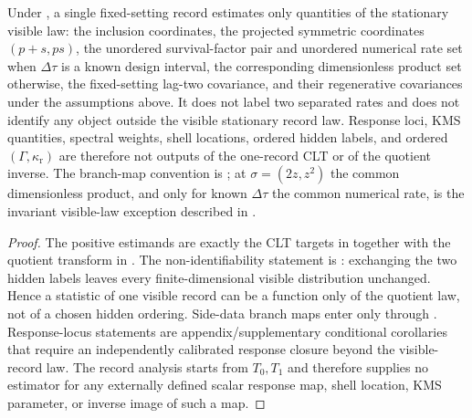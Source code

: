 \begin{proposition}\label{thm:one-record-estimates-main}
Under , a single fixed-setting
record estimates only quantities of the stationary visible law: the inclusion
coordinates, the projected
symmetric coordinates \((p+s,ps)\), the unordered survival-factor pair and
unordered numerical rate set when \(\Delta\tau\) is a known design interval,
the corresponding dimensionless product set otherwise, the fixed-setting
lag-two covariance, and their regenerative covariances under the assumptions
above.  It does not label two separated rates and does not identify any object
outside the visible stationary record law.  Response loci, KMS quantities,
spectral weights, shell locations, ordered hidden labels, and ordered
\((\Gamma,\kappa_{\mathrm r})\) are therefore not outputs of the one-record
CLT or of the quotient inverse.  The branch-map convention is
; at \(\sigma=(2z,z^2)\) the common
dimensionless product, and only for known \(\Delta\tau\) the common numerical
rate, is the invariant visible-law exception described in
.
\end{proposition}

\begin{proof}
The positive estimands are exactly the CLT targets in
together with the quotient transform in
.
The non-identifiability statement is
: exchanging the two
hidden labels leaves every finite-dimensional visible distribution unchanged.
Hence a statistic of one visible record can be a function only of the quotient
law, not of a chosen hidden ordering.  Side-data branch maps enter only through
.
Response-locus statements are appendix/supplementary conditional corollaries
that require an independently calibrated response closure beyond the
visible-record law.  The record analysis starts from \(T_0,T_1\) and therefore
supplies no estimator for
any externally defined scalar response map, shell location, KMS parameter, or
inverse image of such a map.
\end{proof}
